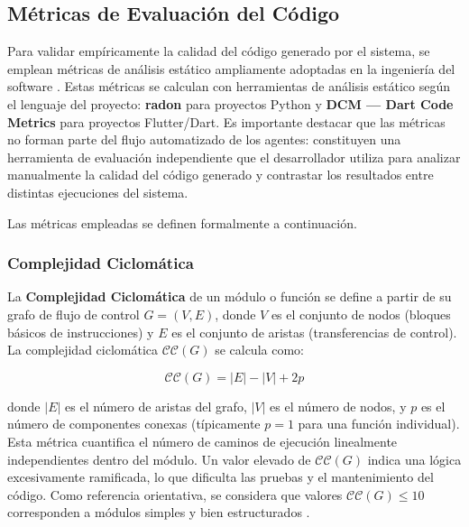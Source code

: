 \documentclass[11pt, letterpaper]{article}
\begin{document}
\subsection{Métricas de Evaluación del Código}
\label{sec:metricas}

Para validar empíricamente la calidad del código generado por el sistema, se emplean métricas de análisis estático ampliamente adoptadas en la ingeniería del software \cite{sommerville_se_2015}. Estas métricas se calculan con herramientas de análisis estático según el lenguaje del proyecto: \textbf{radon} \cite{Lacchia_radon} para proyectos Python y \textbf{DCM --- Dart Code Metrics} \cite{dart_code_metrics} para proyectos Flutter/Dart. Es importante destacar que las métricas no forman parte del flujo automatizado de los agentes: constituyen una herramienta de evaluación independiente que el desarrollador utiliza para analizar manualmente la calidad del código generado y contrastar los resultados entre distintas ejecuciones del sistema.

Las métricas empleadas se definen formalmente a continuación.

\subsubsection{Complejidad Ciclomática}

La \textbf{Complejidad Ciclomática} \cite{McCabe_Complexity} de un módulo o función se define a partir de su grafo de flujo de control $G = (V, E)$, donde $V$ es el conjunto de nodos (bloques básicos de instrucciones) y $E$ es el conjunto de aristas (transferencias de control). La complejidad ciclomática $\mathcal{CC}(G)$ se calcula como:

\begin{equation}
    \mathcal{CC}(G) = |E| - |V| + 2p
    \label{eq:cyclomatic}
\end{equation}

\noindent donde $|E|$ es el número de aristas del grafo, $|V|$ es el número de nodos, y $p$ es el número de componentes conexas (típicamente $p = 1$ para una función individual). Esta métrica cuantifica el número de caminos de ejecución linealmente independientes dentro del módulo. Un valor elevado de $\mathcal{CC}(G)$ indica una lógica excesivamente ramificada, lo que dificulta las pruebas y el mantenimiento del código. Como referencia orientativa, se considera que valores $\mathcal{CC}(G) \leq 10$ corresponden a módulos simples y bien estructurados \cite{McCabe_Complexity}.
\end{document}
